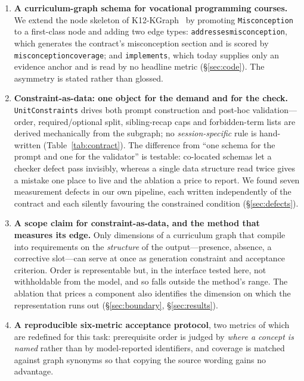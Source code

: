 \documentclass[review,12pt]{elsarticle}
\renewcommand{\_}{\kgunderscore\allowbreak}
\newcommand{\id}[1]{\texttt{#1}}
\begin{document}
\begin{enumerate}
  \item \textbf{A curriculum-graph schema for vocational programming courses.}
  We extend the node skeleton of K12-KGraph~\cite{liang2026k12kgraph} by
  promoting \id{Misconception} to a first-class node and adding two edge types:
  \id{addresses\_misconception}, which generates the contract's misconception
  section and is scored by \id{misconception\_coverage}; and \id{implements},
  which today supplies only an evidence anchor and is read by no headline metric
  (\S\ref{sec:code}). The asymmetry is stated rather than glossed.

  \item \textbf{Constraint-as-data: one object for the demand and for the
  check.} \id{UnitConstraints} drives both prompt construction and post-hoc
  validation---order, required/optional split, sibling-recap caps and
  forbidden-term lists are derived mechanically from the subgraph; no
  \emph{session-specific} rule is hand-written (Table~\ref{tab:contract}). The
  difference from ``one schema for the prompt and one for the validator'' is
  testable: co-located schemas let a checker defect pass invisibly, whereas a
  single data structure read twice gives a mistake one place to live and the
  ablation a price to report. We found seven measurement defects in our
  own pipeline, each written independently of the contract and each silently
  favouring the constrained condition (\S\ref{sec:defects}).

  \item \textbf{A scope claim for constraint-as-data, and the method that
  measures its edge.} Only dimensions of a curriculum graph that compile into
  requirements on the \emph{structure} of the output---presence, absence, a
  corrective slot---can serve at once as generation constraint and acceptance
  criterion. Order is representable but, in the interface tested here, not
  withholdable from the model, and so falls outside the method's range. The
  ablation that prices a component also identifies the dimension on which the
  representation runs out (\S\ref{sec:boundary}, \S\ref{sec:results}).

  \item \textbf{A reproducible six-metric acceptance protocol}, two metrics of
  which are redefined for this task: prerequisite order is judged by \emph{where
  a concept is named} rather than by model-reported identifiers, and coverage is
  matched against graph synonyms so that copying the source wording gains no
  advantage.


\end{enumerate}
\end{document}
